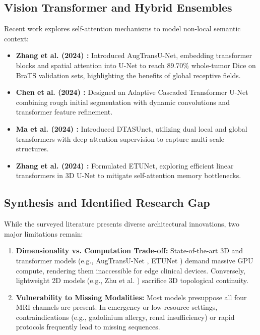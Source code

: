 \documentclass[12pt, a4paper]{article}
\begin{document}
\subsection{Vision Transformer and Hybrid Ensembles}
Recent work explores self-attention mechanisms to model non-local semantic context:
\begin{itemize}[leftmargin=*, itemsep=4pt]
    \item \textbf{Zhang et al. (2024) \cite{zhang2024augtransunet}:} Introduced AugTransU-Net, embedding transformer blocks and spatial attention into U-Net to reach 89.70\% whole-tumor Dice on BraTS validation sets, highlighting the benefits of global receptive fields.
    \item \textbf{Chen et al. (2024) \cite{chen2024actransunet}:} Designed an Adaptive Cascaded Transformer U-Net combining rough initial segmentation with dynamic convolutions and transformer feature refinement.
    \item \textbf{Ma et al. (2024) \cite{ma2024dtasunet}:} Introduced DTASUnet, utilizing dual local and global transformers with deep attention supervision to capture multi-scale structures.
    \item \textbf{Zhang et al. (2024) \cite{zhang2024etunet}:} Formulated ETUNet, exploring efficient linear transformers in 3D U-Net to mitigate self-attention memory bottlenecks.
\end{itemize}

\subsection{Synthesis and Identified Research Gap}
While the surveyed literature presents diverse architectural innovations, two major limitations remain:
\begin{enumerate}[leftmargin=*, itemsep=4pt]
    \item \textbf{Dimensionality vs. Computation Trade-off:} State-of-the-art 3D and transformer models (e.g., AugTransU-Net \cite{zhang2024augtransunet}, ETUNet \cite{zhang2024etunet}) demand massive GPU compute, rendering them inaccessible for edge clinical devices. Conversely, lightweight 2D models (e.g., Zhu et al. \cite{zhu2024improvedunet}) sacrifice 3D topological continuity.
    \item \textbf{Vulnerability to Missing Modalities:} Most models presuppose all four MRI channels are present. In emergency or low-resource settings, contraindications (e.g., gadolinium allergy, renal insufficiency) or rapid protocols frequently lead to missing sequences.
\end{enumerate}
\end{document}
